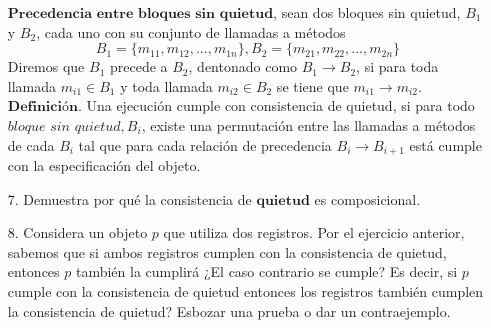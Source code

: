 \documentclass[12pt, letterpaper]{article}
\begin{document}
\begin{itemize}
$\textbf{Precedencia entre bloques sin quietud}$, sean dos bloques sin quietud, $B_1$ y $B_2$, cada uno con su conjunto de llamadas a métodos 
$$B_1 = \{m_{11}, m_{12}, ... , m_{1n} \},  B_2 = \{m_{21}, m_{22}, ... , m_{2n} \}$$
Diremos que $B_1$ precede a $B_2$, dentonado como $B_1 \rightarrow B_2$, si para toda llamada $m_{i1} \in B_1$ y toda llamada $m_{i2} \in B_2$ se tiene que $m_{i1} \rightarrow m_{i2}$.\\

$\textbf{Definición}.$ Una ejecución cumple con consistencia de quietud, si para todo\\
$\textit{bloque sin quietud}, B_i$, existe una permutación entre las llamadas a métodos de cada $B_i$ tal que para cada relación de precedencia $B_i \rightarrow B_{i+1}$ está cumple con la especificación del objeto.


\item[7. ]Demuestra por qué la consistencia de $\textbf{quietud}$ es composicional.

\item[8. ] Considera un objeto $p$ que utiliza dos registros. Por el ejercicio anterior, sabemos que si ambos registros cumplen con la consistencia de quietud, entonces $p$ también la cumplirá ¿El caso contrario se cumple? Es decir, si $p$ cumple con la consistencia de quietud entonces los registros también cumplen la consistencia de quietud? Esbozar una prueba o dar un contraejemplo.


\end{itemize}
\end{document}
